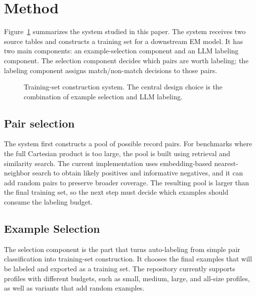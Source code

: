 \section{Method}

Figure~\ref{fig:pipeline} summarizes the system studied in this paper. The system receives two source tables and constructs a training set for a downstream EM model. It has two main components: an example-selection component and an LLM labeling component. The selection component decides which pairs are worth labeling; the labeling component assigns match/non-match decisions to those pairs.

\begin{figure}[t]
  \centering
  \caption{Training-set construction system. The central design choice is the combination of example selection and LLM labeling.}
  \label{fig:pipeline}
\end{figure}

\subsection{Pair selection}

The system first constructs a pool of possible record pairs. For benchmarks where the full Cartesian product is too large, the pool is built using retrieval and similarity search. The current implementation uses embedding-based nearest-neighbor search to obtain likely positives and informative negatives, and it can add random pairs to preserve broader coverage. The resulting pool is larger than the final training set, so the next step must decide which examples should consume the labeling budget.

\subsection{Example Selection}

The selection component is the part that turns auto-labeling from simple pair classification into training-set construction. It chooses the final examples that will be labeled and exported as a training set. The repository currently supports profiles with different budgets, such as small, medium, large, and all-size profiles, as well as variants that add random examples.

